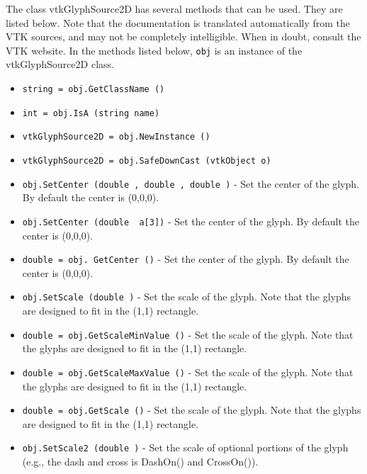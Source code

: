 The class vtkGlyphSource2D has several methods that can be used.
  They are listed below.
Note that the documentation is translated automatically from the VTK sources,
and may not be completely intelligible.  When in doubt, consult the VTK website.
In the methods listed below, \verb|obj| is an instance of the vtkGlyphSource2D class.
\begin{itemize}
\item  \verb|string = obj.GetClassName ()|

\item  \verb|int = obj.IsA (string name)|

\item  \verb|vtkGlyphSource2D = obj.NewInstance ()|

\item  \verb|vtkGlyphSource2D = obj.SafeDownCast (vtkObject o)|

\item  \verb|obj.SetCenter (double , double , double )| -  Set the center of the glyph. By default the center is (0,0,0).

\item  \verb|obj.SetCenter (double  a[3])| -  Set the center of the glyph. By default the center is (0,0,0).

\item  \verb|double = obj. GetCenter ()| -  Set the center of the glyph. By default the center is (0,0,0).

\item  \verb|obj.SetScale (double )| -  Set the scale of the glyph. Note that the glyphs are designed
 to fit in the (1,1) rectangle.

\item  \verb|double = obj.GetScaleMinValue ()| -  Set the scale of the glyph. Note that the glyphs are designed
 to fit in the (1,1) rectangle.

\item  \verb|double = obj.GetScaleMaxValue ()| -  Set the scale of the glyph. Note that the glyphs are designed
 to fit in the (1,1) rectangle.

\item  \verb|double = obj.GetScale ()| -  Set the scale of the glyph. Note that the glyphs are designed
 to fit in the (1,1) rectangle.

\item  \verb|obj.SetScale2 (double )| -  Set the scale of optional portions of the glyph (e.g., the
 dash and cross is DashOn() and CrossOn()).


\end{itemize}

